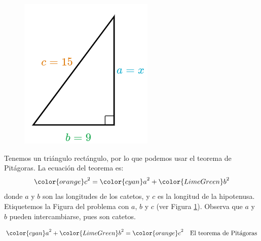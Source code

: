 \begin{minipage}[t][][t]{0.65\textwidth}
    \begin{solutionbox}{9.5cm}
        \begin{minipage}{0.4\textwidth}
            \begin{figure}[H]
                \centering
                \includegraphics[width=0.8\linewidth]{../images/lados_pitagoras_27a.png}
                \caption{}
                \label{fig:lados_pitagoras_27a}
            \end{figure}
        \end{minipage}\hfill
        \begin{minipage}{0.55\textwidth}
            Tenemos un triángulo rectángulo, por lo que podemos usar el teorema de Pitágoras.
            La ecuación del teorema es:
            \[{\color{orange}c}^2={\color{cyan}a}^2+{\color{LimeGreen}b}^2\]
            donde $a$ y $b$ son las longitudes de los catetos, y $c$ es la longitud de la hipotenusa.
            Etiquetemos la Figura del problema con $a$, $b$ y $c$ (ver Figura \ref{fig:lados_pitagoras_27a}).
            Observa que $a$ y $b$ pueden intercambiarse, pues son catetos.
        \end{minipage}
        \begin{align*}
            {\color{cyan}a}^2+{\color{LimeGreen}b}^2  ={\color{orange}c}^2  & \text{\quad El teorema de Pitágoras}                          \\

\end{align*}
\end{solutionbox}
\end{minipage}
